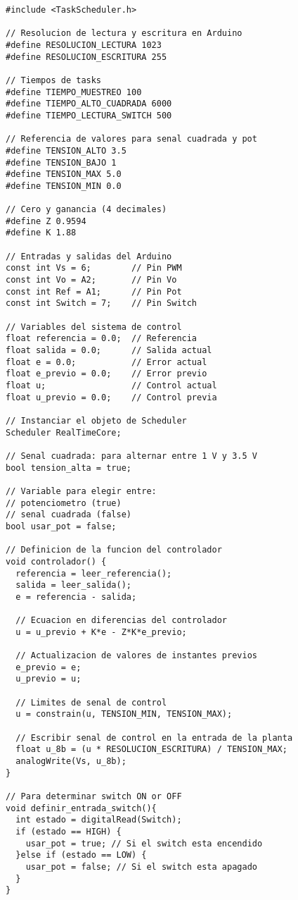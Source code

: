 \begin{adjustwidth}{0.5cm}{0.5cm}
\begin{lstlisting}[style=arduino, caption={Código implementado en Arduino para el sistema de control realimentado.}, label=lst:arduino]
#include <TaskScheduler.h>

// Resolucion de lectura y escritura en Arduino
#define RESOLUCION_LECTURA 1023
#define RESOLUCION_ESCRITURA 255

// Tiempos de tasks
#define TIEMPO_MUESTREO 100
#define TIEMPO_ALTO_CUADRADA 6000
#define TIEMPO_LECTURA_SWITCH 500

// Referencia de valores para senal cuadrada y pot
#define TENSION_ALTO 3.5
#define TENSION_BAJO 1
#define TENSION_MAX 5.0
#define TENSION_MIN 0.0

// Cero y ganancia (4 decimales)
#define Z 0.9594
#define K 1.88

// Entradas y salidas del Arduino
const int Vs = 6;        // Pin PWM
const int Vo = A2;       // Pin Vo
const int Ref = A1;      // Pin Pot
const int Switch = 7;    // Pin Switch

// Variables del sistema de control
float referencia = 0.0;  // Referencia
float salida = 0.0;      // Salida actual
float e = 0.0;           // Error actual
float e_previo = 0.0;    // Error previo
float u;                 // Control actual
float u_previo = 0.0;    // Control previa

// Instanciar el objeto de Scheduler
Scheduler RealTimeCore;

// Senal cuadrada: para alternar entre 1 V y 3.5 V
bool tension_alta = true;

// Variable para elegir entre:
// potenciometro (true)
// senal cuadrada (false)
bool usar_pot = false;

// Definicion de la funcion del controlador
void controlador() {
  referencia = leer_referencia();
  salida = leer_salida();
  e = referencia - salida;

  // Ecuacion en diferencias del controlador
  u = u_previo + K*e - Z*K*e_previo;

  // Actualizacion de valores de instantes previos
  e_previo = e;
  u_previo = u;

  // Limites de senal de control
  u = constrain(u, TENSION_MIN, TENSION_MAX);

  // Escribir senal de control en la entrada de la planta
  float u_8b = (u * RESOLUCION_ESCRITURA) / TENSION_MAX;
  analogWrite(Vs, u_8b);
}

// Para determinar switch ON or OFF
void definir_entrada_switch(){
  int estado = digitalRead(Switch);
  if (estado == HIGH) {
    usar_pot = true; // Si el switch esta encendido
  }else if (estado == LOW) {
    usar_pot = false; // Si el switch esta apagado
  }
}


\end{lstlisting}
\end{adjustwidth}
